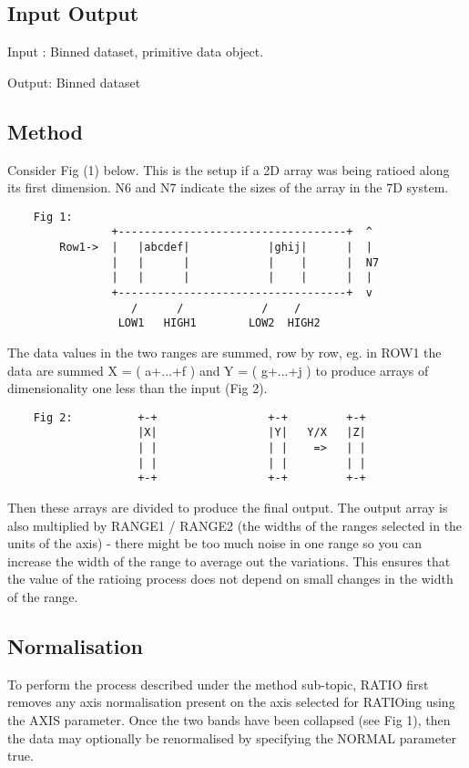 \documentclass{book}
\renewcommand{\_}{{\tt\char'137}}     %
\begin{document}
\subsection{Input Output}
Input : Binned dataset, primitive data object.
 
Output: Binned dataset
 
\subsection{Method}
Consider Fig (1) below. This is the setup if a 2D array was being
ratioed along its first dimension. N6 and N7 indicate the sizes
of the array in the 7D system.
 
\begin{verbatim}
    Fig 1:      
                +-----------------------------------+  ^
        Row1->  |   |abcdef|            |ghij|      |  |
                |   |      |            |    |      |  N7
                |   |      |            |    |      |  |
                +-----------------------------------+  v
                   /      /            /    /
                 LOW1   HIGH1        LOW2  HIGH2
 \end{verbatim}
The data values in the two ranges are summed, row by row, eg. in
ROW1 the data are summed X = ( a+...+f ) and Y = ( g+...+j ) to
produce arrays of dimensionality one less than the input (Fig 2).
\begin{verbatim}
    Fig 2:          +-+                 +-+         +-+
                    |X|                 |Y|   Y/X   |Z|
                    | |                 | |    =>   | |
                    | |                 | |         | |
                    +-+                 +-+         +-+
  \end{verbatim}
Then these arrays are divided to produce the final output. The
output array is also multiplied by RANGE1 / RANGE2 (the widths of
the ranges selected in the units of the axis) - there might be
too much noise in one range so you can increase the width of the
range to average out the variations. This ensures that the value
of the ratioing process does not depend on small changes in the
width of the range.
 
\subsection{Normalisation}
To perform the process described under the method sub-topic, RATIO
first removes any axis normalisation present on the axis selected
for RATIOing using the AXIS parameter. Once the two bands have been
collapsed (see Fig 1), then the data may optionally be renormalised
by specifying the NORMAL parameter true.
 
\end{document}
